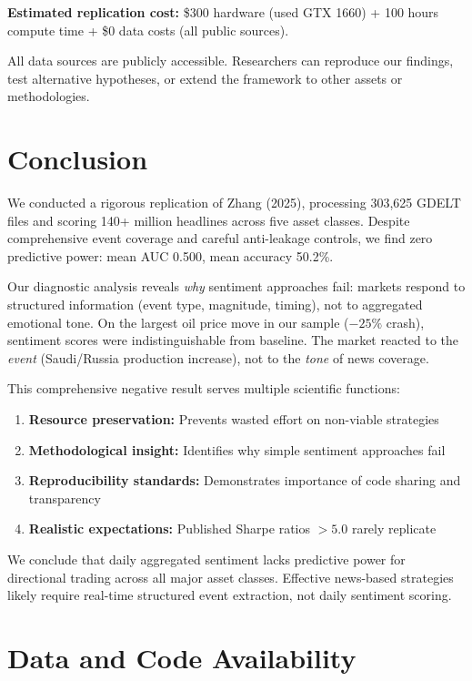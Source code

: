 \documentclass[11pt]{article}
\begin{document}
\textbf{Estimated replication cost:} \$300 hardware (used GTX 1660) + 100 hours compute time + \$0 data costs (all public sources).

All data sources are publicly accessible. Researchers can reproduce our findings, test alternative hypotheses, or extend the framework to other assets or methodologies.

\section{Conclusion}

We conducted a rigorous replication of Zhang (2025), processing 303,625 GDELT files and scoring 140+ million headlines across five asset classes. Despite comprehensive event coverage and careful anti-leakage controls, we find zero predictive power: mean AUC 0.500, mean accuracy 50.2\%.

Our diagnostic analysis reveals \textit{why} sentiment approaches fail: markets respond to structured information (event type, magnitude, timing), not to aggregated emotional tone. On the largest oil price move in our sample ($-25\%$ crash), sentiment scores were indistinguishable from baseline. The market reacted to the \textit{event} (Saudi/Russia production increase), not to the \textit{tone} of news coverage.

This comprehensive negative result serves multiple scientific functions:
\begin{enumerate}
    \item \textbf{Resource preservation:} Prevents wasted effort on non-viable strategies
    \item \textbf{Methodological insight:} Identifies why simple sentiment approaches fail
    \item \textbf{Reproducibility standards:} Demonstrates importance of code sharing and transparency
    \item \textbf{Realistic expectations:} Published Sharpe ratios $> 5.0$ rarely replicate
\end{enumerate}

We conclude that daily aggregated sentiment lacks predictive power for directional trading across all major asset classes. Effective news-based strategies likely require real-time structured event extraction, not daily sentiment scoring.

\section*{Data and Code Availability}
\end{document}
